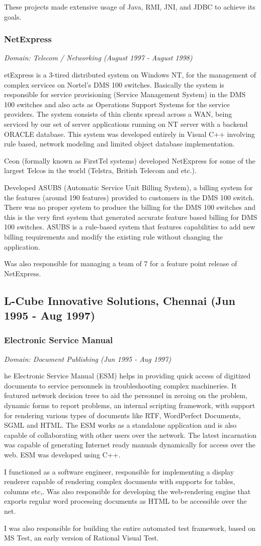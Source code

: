 \documentclass[a4paper,11pt]{article}
\newcommand\cvsubsection[3]{\subsection*{#1 \quad \small{(#2 - #3)}}}
\newcommand\cvprojectentry[5]{
  \subsubsection*{#1}
  
  \vspace{-7pt}
  
  \it{Domain: #2}\normalfont{} \quad (#3 - #4)
  
}
\begin{document}
\begin{multicols}{2}
These projects made extensive usage of Java, RMI, JNI, and JDBC to
achieve its goals.
 
\cvprojectentry{NetExpress}{Telecom / Networking}{August 1997}{August 1998}

NetExpress is a 3-tired distributed system on Windows NT, for the
management of complex services on Nortel’s DMS 100 switches. Basically
the system is responsible for service provisioning (Service Management
System) in the DMS 100 switches and also acts as Operations Support
Systems for the service providers. The system consists of thin clients
spread across a WAN, being serviced by our set of server applications
running on NT server with a backend ORACLE database. This system was
developed entirely in Visual C++ involving rule based, network
modeling and limited object database implementation.
 
Ceon (formally known as FirstTel systems) developed NetExpress for
some of the largest Telcos in the world (Telstra, British Telecom and
etc.).
 
Developed ASUBS (Automatic Service Unit Billing System), a billing
system for the features (around 190 features) provided to customers in
the DMS 100 switch. There was no proper system to produce the billing
for the DMS 100 switches and this is the very first system that
generated accurate feature based billing for DMS 100 switches. ASUBS
is a rule-based system that features capabilities to add new billing
requirements and modify the existing rule without changing the
application.
 
Was also responsible for managing a team of 7 for a feature point
release of NetExpress.

\cvsubsection{L-Cube Innovative Solutions, Chennai}{Jun 1995}{Aug 1997}

\cvprojectentry{Electronic Service Manual}{Document Publishing}{Jun 1995}{Aug 1997}
 
The Electronic Service Manual (ESM) helps in providing quick access of
digitized documents to service personnels in troubleshooting complex
machineries. It featured network decision trees to aid the personnel
in zeroing on the problem, dynamic forms to report problems, an
internal scripting framework, with support for rendering various types
of documents like RTF, WordPerfect Documents, SGML and HTML. The ESM
works as a standalone application and is also capable of collaborating
with other users over the network. The latest incarnation was capable
of generating Internet ready manuals dynamically for access over the
web. ESM was developed using C++.
 
I functioned as a software engineer, responsible for implementing a
display renderer capable of rendering complex documents with supports
for tables, columns etc,. Was also responsible for developing the
web-rendering engine that exports regular word processing documents as
HTML to be accessible over the net.
 
I was also responsible for building the entire automated test
framework, based on MS Test, an early version of Rational Visual Test.

\end{multicols}
\end{document}

